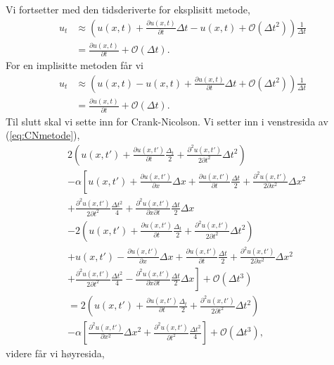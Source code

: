 \documentclass[norsk, 10pt]{article}
\begin{document}
Vi fortsetter med den tidsderiverte for eksplisitt metode,
\begin{align}
u_t &\approx \left(u(x,t)+\frac{\partial u(x,t)}{\partial t}\Delta t - u(x,t) +  \mathcal{O}(\Delta t^2) \right)\frac{1}{\Delta t} \nonumber\\
&=\frac{\partial u(x,t)}{\partial t}+ \mathcal{O}(\Delta t). \label{eq:trunkteksplisitt}
\end{align}
For en implisitte metoden får vi
\begin{align}
u_t &\approx \left(u(x,t) - u(x,t) + \frac{\partial u(x,t)}{\partial t}\Delta t  + \mathcal{O}(\Delta t^2) \right)\frac{1}{\Delta t} \nonumber\\
&=\frac{\partial u(x,t)}{\partial t}+ \mathcal{O}(\Delta t). \label{eq:trunktimplisitt} 
\end{align}
Til slutt skal vi sette inn for Crank-Nicolson. Vi setter inn i venstresida av (\ref{eq:CNmetode}),
\begin{align*}
&2\left(u(x,t')+\frac{\partial u(x,t')}{\partial t}\frac{\Delta_t}{2} +\frac{\partial ^2 u(x,t')}{2\partial t^2}\Delta t^2\right) \\
& - \alpha\left[u(x,t')+\frac{\partial u(x,t')}{\partial x}\Delta x+\frac{\partial u(x,t')}{\partial t} \frac{\Delta t}{2} +\frac{\partial^2 u(x,t')}{2\partial x^2}\Delta x^2\right. \\ 
&+\frac{\partial^2 u(x,t')}{2\partial t^2}\frac{\Delta t^2}{4} +\frac{\partial^2 u(x,t')}{\partial x\partial t}\frac{\Delta t}{2} \Delta x\\
&-2\left( u(x,t')+\frac{\partial u(x,t')}{\partial t}\frac{\Delta_t}{2} +\frac{\partial ^2 u(x,t')}{2\partial t^2}\Delta t^2   \right) \\
&+ u(x,t')-\frac{\partial u(x,t')}{\partial x}\Delta x+\frac{\partial u(x,t')}{\partial t} \frac{\Delta t}{2} +\frac{\partial^2 u(x,t')}{2\partial x^2}\Delta x^2\\  
&\left.+\frac{\partial^2 u(x,t')}{2\partial t^2}\frac{\Delta t^2}{4} -\frac{\partial^2 u(x,t')}{\partial x\partial t}\frac{\Delta t}{2} \Delta x\right] + \mathcal{O}(\Delta t^3)\\
%
&= 2\left(u(x,t')+\frac{\partial u(x,t')}{\partial t}\frac{\Delta_t}{2} +\frac{\partial ^2 u(x,t')}{2\partial t^2}\Delta t^2\right) \\
& - \alpha\left[\frac{\partial^2 u(x,t')}{\partial x^2}\Delta x^2+\frac{\partial^2 u(x,t')}{\partial t^2}\frac{\Delta t^2}{4} \right]+ \mathcal{O}(\Delta t^3),
\end{align*}
videre får vi høyresida,
\end{document}
